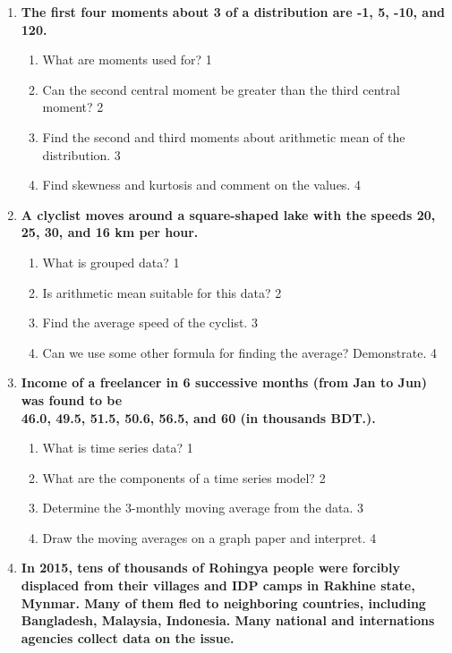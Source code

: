 \documentclass{article}
\begin{document}
\begin{enumerate}
 \item
	  \textbf{The first four moments about 3 of a distribution are -1, 5, -10, and 120.} 
  
  \begin{enumerate}
    \item
	What are moments used for? \hfill 1
    \item
	Can the second central moment be greater than the third central moment? \hfill 2
    \item  
	Find the second and third moments about arithmetic mean of the distribution. \hfill 3
    \item
	Find skewness and kurtosis and comment on the values.  \hfill 4
\end{enumerate}
  
 \item
	  \textbf{A clyclist moves around a square-shaped lake with the speeds 20, 25, 30, and 16 km per hour.} 
  
  \begin{enumerate}
    \item
	What is grouped data? \hfill 1
    \item
	Is arithmetic mean suitable for this data? \hfill 2
    \item  
	Find the average speed of the cyclist. \hfill 3
    \item
	Can we use some other formula for finding the average? Demonstrate. \hfill 4
  \end{enumerate}
  
 \item
	  \textbf{Income of a freelancer in 6 successive months (from Jan to Jun) was found to be \\ 46.0, 49.5, 51.5, 50.6, 56.5, and 60 (in thousands BDT.).}
  \begin{enumerate}
    \item
	What is time series data? \hfill 1
    \item
	What are the components of a time series model? \hfill 2
    \item  
	Determine the 3-monthly moving average from the data. \hfill 3
    \item
	Draw the moving averages on a graph paper and interpret. \hfill 4
\end{enumerate}

 \item
	  \textbf{In 2015, tens of thousands of Rohingya people were forcibly displaced from their villages and IDP camps in Rakhine state, Mynmar. Many of them fled to neighboring countries, including Bangladesh, Malaysia, Indonesia. Many national and internations agencies collect data on the issue.} 
  

\end{enumerate}
\end{document}
